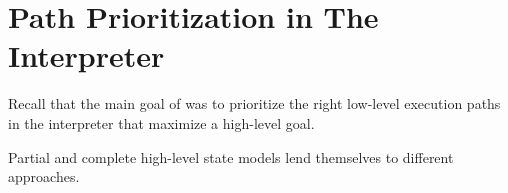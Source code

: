
\section{Path Prioritization in The Interpreter}
\label{sec:chef:strategies}




Recall that the main goal of \chef was to prioritize the right low-level execution paths in the interpreter that maximize a high-level goal.

Partial and complete high-level state models lend themselves to different approaches.

